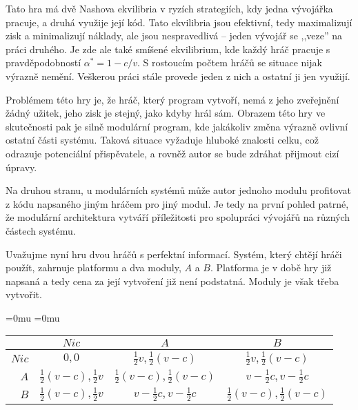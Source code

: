 \begin{multicols}{2}
		Tato hra má dvě Nashova ekvilibria v ryzích strategiích, kdy jedna vývojářka pracuje, a druhá využije její kód. Tato ekvilibria jsou efektivní, tedy maximalizují zisk a minimalizují náklady, ale jsou nespravedlivá -- jeden vývojář se ,,veze'' na práci druhého. Je zde ale také smíšené ekvilibrium, kde  každý hráč pracuje s pravděpodobností $\alpha^* = 1-c/v$. S rostoucím počtem hráčů se situace nijak výrazně nemění. Veškerou práci stále provede jeden z nich a ostatní ji jen využijí.

		Problémem této hry je, že hráč, který program vytvoří, nemá z jeho zveřejnění žádný užitek, jeho zisk je stejný, jako kdyby hrál sám. Obrazem této hry ve skutečnosti pak je silně modulární program, kde jakákoliv změna výrazně ovlivní ostatní části systému. Taková situace vyžaduje hluboké znalosti celku, což odrazuje potenciální přispěvatele, a rovněž autor se bude zdráhat přijmout cizí úpravy.

		Na druhou stranu, u modulárních systémů může autor jednoho modulu profitovat z kódu napsaného jiným hráčem pro jiný modul. Je tedy na první pohled patrné, že modulární architektura vytváří příležitosti pro spolupráci vývojářů na různých částech systému.

		Uvažujme nyní hru dvou hráčů s perfektní informací. Systém, který chtějí hráči použít, zahrnuje platformu a dva moduly, $A$ a $B$. Platforma je v době hry již napsaná a tedy cena za její vytvoření již není podstatná. Moduly je však třeba vytvořit.


			\begin{Figure}
			\begin{center}
			\begingroup
			\medmuskip=0mu
			\thickmuskip=0mu
				\makeatletter\def\f@size{8}
			\hskip-0.7cm
			\begin{tabular}{r| c c c}
					& $Nic$ & $A$ & $B$ \\
					\hline
				$Nic$ &
				 	$0,0$ &
					$\frac{1}{2}v, \frac{1}{2}(v-c)$ &
					$\frac{1}{2}v, \frac{1}{2}(v-c)$ \\
				$A$ &
					$\frac{1}{2}(v-c), \frac{1}{2}v$ &
					$\frac{1}{2}(v-c), \frac{1}{2}(v-c)$ &
					\cellcolor{gray!20}$v-\frac{1}{2}c, v-\frac{1}{2}c$ \\
				$B$ &
					$\frac{1}{2}(v-c), \frac{1}{2}v$ &
					\cellcolor{gray!20}$v-\frac{1}{2}c, v-\frac{1}{2}c$ &
					$\frac{1}{2}(v-c), \frac{1}{2}(v-c)$ \\
			\end{tabular}
			\endgroup
			\end{center}
			\label{tab:involuntary-altruism-modules-perfect-information}
			\end{Figure}


\end{multicols}
